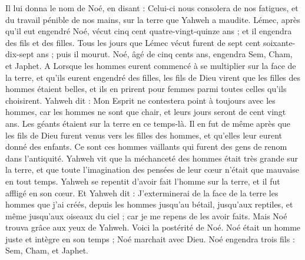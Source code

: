 \begin{multicols}{2}
Il lui donna le nom de Noé, en disant : Celui-ci nous consolera de nos fatigues, et du travail pénible de nos mains, sur la terre que Yahweh a maudite.
Lémec, après qu'il eut engendré Noé, vécut cinq cent quatre-vingt-quinze ans ; et il engendra des fils et des filles.
Tous les jours que Lémec vécut furent de sept cent soixante-dix-sept ans ; puis il mourut.
Noé, âgé de cinq cents ans, engendra Sem, Cham, et Japhet.
\VerseOne{}A Lorsque les hommes eurent commencé à se multiplier sur la face de la terre, et qu'ils eurent engendré des filles,
les fils de Dieu virent que les filles des hommes étaient belles, et ils en prirent pour femmes parmi toutes celles qu'ils choisirent.
Yahweh dit : Mon Esprit ne contestera point à toujours avec les hommes, car les hommes ne sont que chair, et leurs jours seront de cent vingt ans.
Les géants étaient sur la terre en ce temps-là.  Il en fut de même après que les fils de Dieu furent venus vers les filles des hommes, et qu’elles leur eurent donné des enfants. Ce sont ces hommes vaillants qui furent des gens de renom dans l’antiquité.
Yahweh vit que la méchanceté des hommes était très grande sur la terre, et que toute l'imagination des pensées de leur cœur n'était que mauvaise en tout temps.
Yahweh se repentit d'avoir fait l'homme sur la terre, et il fut affligé en son cœur.
Et Yahweh dit : J'exterminerai de la face de la terre les hommes que j'ai créés, depuis les hommes jusqu'au bétail, jusqu'aux reptiles, et même jusqu'aux oiseaux du ciel ; car je me repens de les avoir faits.
Mais Noé trouva grâce aux yeux de Yahweh.
Voici la postérité de Noé. Noé était un homme juste et intègre en son temps ; Noé marchait avec Dieu.
Noé engendra trois fils : Sem, Cham, et Japhet.

\end{multicols}

